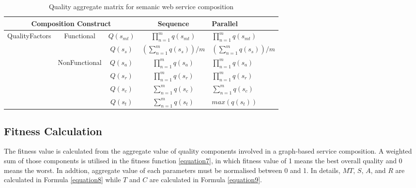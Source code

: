 \documentclass{llncs}
\begin{document}
\begin{table}[]
\centering
\caption{Quality aggregate matrix for semanic web service composition}
\label{table1}
\begin{tabular}{|c|c|c|c|l|}
\hline
\multicolumn{3}{|c|}{Composition Construct}                                      & Sequence                             & Parallel \\ \hline
\multirow{5}{*}{QualityFactors} & \multirow{2}{*}{Functional}    & $Q(s_ {mt})$  &$\prod_{n=1}^{m} q(s_ {mt})$          &  $\prod_{n=1}^{m} q(s_ {mt})$ \\ \cline{3-5}
                                &                                & $Q(s_ {s})$  & $(\sum_{n=1}^m q(s_ {s}))/m$        &  $(\sum_{n=1}^m q(s_ {s}))/m$  \\ \cline{2-5}   
                                & \multirow{4}{*}{NonFunctional} & $Q(s_{a})$    & $\prod_{n=1}^{m} q(s_a)$             &  $\prod_{n=1}^{m} q(s_a)$ \\ \cline{3-5} 
                                &                                & $Q(s_{r})$    & $\prod_{n=1}^{m} q(s_r)$             &  $\prod_{n=1}^{m} q(s_r)$ \\ \cline{3-5} 
                                &                                & $Q(s_{c})$    & $\sum_{n=1}^m q(s_ {c})$             &  $\sum_{n=1}^m q(s_ {c})$ \\ \cline{3-5} 
                                &                                & $Q(s_{t})$    & $\sum_{n=1}^m q(s_ {t})$             &  $max(q(s_ {t}))$ \\ \hline
\end{tabular}
\end{table}

\subsection{Fitness Calculation}
The fitness value is calculated from the aggregate value of quality components involved in a graph-based service composition. A weighted sum of those components is utilised in the fitness function \ref{equation7}, in which fitness value of 1 means the best overall quality and 0 means the worst. In addtion, aggregate value of each parameters must be normalised between 0 and 1. In details, $MT$, $S$, $A$, and $R$ are calculated in Formula \ref{equation8} while $T$ and $C$ are calculated in Formula \ref{equation9}.
\end{document}
